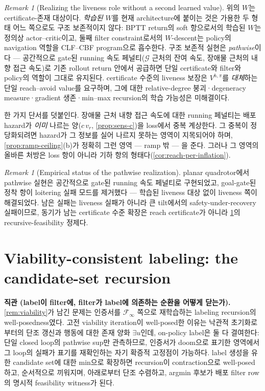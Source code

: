 \documentclass[11pt]{article}
\theoremstyle{plain}
\theoremstyle{definition}
\theoremstyle{remark}
\newtheorem{remark}[theorem]{Remark}
\newcommand{\Vhp}[1]{V^{h,#1}}
\newcommand{\Vhpi}{\Vhp{\pi}}
\begin{document}
\begin{remark}[Realizing the liveness role without a second learned value]\label{rem:ra-cotrain}
위의 $W$는 certificate-존재 대상이다. \emph{학습된} $W$를 현재 architecture에 붙이는 것은 가용한 두
형태 어느 쪽으로도 구조 보존적이지 않다: BPTT return의 soft 항으로서의 학습된 $W$는 정의상
actor--critic이고, 둘째 filter constraint로서의 $W$-descent는 policy의 navigation 역할을 CLF--CBF
program으로 흡수한다. 구조 보존적 실현은 \emph{pathwise}이다 --- 공간적으로 gate된 running 속도
페널티($\mathcal G$ 근처의 잔여 속도, 장애물 근처의 내향 접근 속도)로 기존 rollout return 안에서
공급하면 단일 certificate와 filter와 policy의 역할이 그대로 유지된다. certificate 수준의 liveness
보장은 $\Vhpi$를 \emph{대체}하는 단일 reach--avoid value를 요구하며, 그에 대한 relative-degree
붕괴·degeneracy measure·gradient 생존·min--max recursion의 학습 가능성은 미해결이다.

한 가지 단서를 덧붙인다. 장애물 근처 내향 접근 속도에 대한 running 페널티는 배포 hazard가
\emph{이미} 나르는 양($c\,v_r$, \cref{prop:sens-c})을 loss에서 중복 계상한다. 그 중복이 정당화되려면
hazard가 그 정보를 실어 나르지 못하는 영역이 지목되어야 하며, \cref{prop:ramp-ceiling}(b)가 정확히
그런 영역 --- ramp 밖 --- 을 준다. 그러나 그 영역의 올바른 처방은 loss 항이 아니라 기하 항의
형태다(\cref{cor:reach-per-inflation}).
\end{remark}

\begin{remark}[Empirical status of the pathwise realization]\label{rem:pathwise-status}
planar quadrotor에서 pathwise 실현은 공간적으로 gate된 running 속도 페널티로 구현되었고,
goal-gate된 정착 항이 loitering 실패 모드를 제거했다 --- 학습된 liveness 대상 없이 liveness 쪽이
해결되었다. 남은 실패는 liveness 실패가 아니라 큰 tilt에서의 safety-under-recovery 실패이므로,
동기가 남는 certificate 수준 확장은 reach certificate가 아니라 \cref{sec:labeling}의
recursive-feasibility 정제다.
\end{remark}

\section{Viability-consistent labeling: the candidate-set recursion}\label{sec:labeling}

\textbf{직관 (label이 filter에, filter가 label에 의존하는 순환을 어떻게 닫는가).}
\cref{rem:viability}가 남긴 문제는 인증서를 $\mathcal F_\infty$ 쪽으로 재학습하는 labeling
recursion의 well-posedness였다. 고전 viability iteration이 well-posed한 이유는 낙관적 초기화로부터의
단조 갱신과 행동에 대한 존재 양화 $\exists u$인데, on-policy label은 둘 다 결여한다: 단일 closed
loop의 pathwise sup만 관측하므로, 인증서가 doom으로 표기한 영역에서 그 loop의 실패가 표기를
재확인하는 자기 확증적 고정점이 가능하다. label 생성을 유한 candidate set에 대한 min으로 확장하면
recursion이 contraction으로 well-posed하고, 순서적으로 끼워지며, 아래로부터 단조 수렴하고, argmin
후보가 배포 filter row의 명시적 feasibility witness가 된다.
\end{document}
